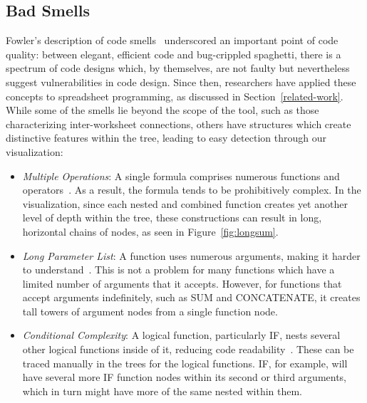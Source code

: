 \documentclass[conference]{IEEEtran}
\begin{document}
	\subsection{Bad Smells} \label{badsmells} Fowler's description of code
	smells~\cite{fowler2009refactoring} underscored an important point of code
	quality: between elegant, efficient code and bug-crippled spaghetti, there is a
	spectrum of code designs which, by themselves, are not faulty but nevertheless
	suggest vulnerabilities in code design. Since then, researchers have applied
	these concepts to spreadsheet programming, as discussed in
	Section~\ref{related-work}. While some of the smells lie beyond the scope of
	the tool, such as those characterizing inter-worksheet connections, others have
	structures which create distinctive features within the tree, leading to easy
	detection through our visualization: \par
	
	\begin{itemize}
		
		\item \textit{Multiple Operations}: A single formula comprises numerous
		functions and operators~\cite{hermans2012detecting}. As a result, the formula
		tends to be prohibitively complex. In the visualization, since each nested and
		combined function creates yet another level of depth within the tree, these
		constructions can result in long, horizontal chains of nodes, as seen in
		Figure~\ref{fig:longsum}.
		
		\item \textit{Long Parameter List}: A function uses numerous arguments, making
		it harder to understand~\cite{asavametha2012detecting}. This is not a problem
		for many functions which have a limited number of arguments that it accepts.
		However, for functions that accept arguments indefinitely, such as SUM and
		CONCATENATE, it creates tall towers of argument nodes from a single function
		node.
		
		\item \textit{Conditional Complexity}: A logical function, particularly IF,
		nests several other logical functions inside of it, reducing code
		readability~\cite{hermans2012detecting}. These can be traced manually in the
		trees for the logical functions. IF, for example, will have several more IF
		function nodes within its second or third arguments, which in turn might have
		more of the same nested within them.
		
	\end{itemize}
	
\end{document}
